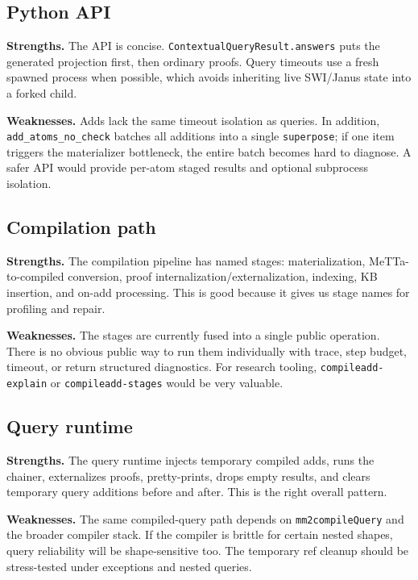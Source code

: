\documentclass[11pt]{article}
\newcommand{\code}[1]{\texttt{#1}}
\begin{document}
\subsection{Python API}

\textbf{Strengths.}  The API is concise.  \code{ContextualQueryResult.answers}
puts the generated projection first, then ordinary proofs.  Query timeouts use a
fresh spawned process when possible, which avoids inheriting live SWI/Janus state
into a forked child.

\textbf{Weaknesses.}  Adds lack the same timeout isolation as queries.  In
addition, \code{add\_atoms\_no\_check} batches all additions into a single
\code{superpose}; if one item triggers the materializer bottleneck, the entire
batch becomes hard to diagnose.  A safer API would provide per-atom staged
results and optional subprocess isolation.

\subsection{Compilation path}

\textbf{Strengths.}  The compilation pipeline has named stages: materialization,
MeTTa-to-compiled conversion, proof internalization/externalization, indexing,
KB insertion, and on-add processing.  This is good because it gives us stage
names for profiling and repair.

\textbf{Weaknesses.}  The stages are currently fused into a single public
operation.  There is no obvious public way to run them individually with trace,
step budget, timeout, or return structured diagnostics.  For research tooling,
\code{compileadd-explain} or \code{compileadd-stages} would be very valuable.

\subsection{Query runtime}

\textbf{Strengths.}  The query runtime injects temporary compiled adds, runs the
chainer, externalizes proofs, pretty-prints, drops empty results, and clears
temporary query additions before and after.  This is the right overall pattern.

\textbf{Weaknesses.}  The same compiled-query path depends on \code{mm2compileQuery}
and the broader compiler stack.  If the compiler is brittle for certain nested
shapes, query reliability will be shape-sensitive too.  The temporary ref cleanup
should be stress-tested under exceptions and nested queries.
\end{document}
